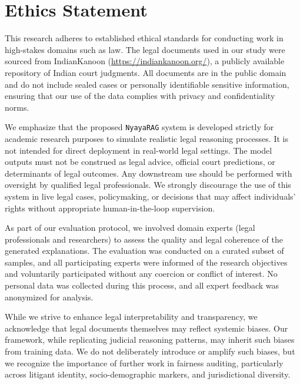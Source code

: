 \section*{Ethics Statement}

This research adheres to established ethical standards for conducting work in high-stakes domains such as law. The legal documents used in our study were sourced from IndianKanoon (\url{https://indiankanoon.org/}), a publicly available repository of Indian court judgments. All documents are in the public domain and do not include sealed cases or personally identifiable sensitive information, ensuring that our use of the data complies with privacy and confidentiality norms.

We emphasize that the proposed \texttt{NyayaRAG} system is developed strictly for academic research purposes to simulate realistic legal reasoning processes. It is not intended for direct deployment in real-world legal settings. The model outputs must not be construed as legal advice, official court predictions, or determinants of legal outcomes. Any downstream use should be performed with oversight by qualified legal professionals. We strongly discourage the use of this system in live legal cases, policymaking, or decisions that may affect individuals' rights without appropriate human-in-the-loop supervision.

As part of our evaluation protocol, we involved domain experts (legal professionals and researchers) to assess the quality and legal coherence of the generated explanations. The evaluation was conducted on a curated subset of samples, and all participating experts were informed of the research objectives and voluntarily participated without any coercion or conflict of interest. No personal data was collected during this process, and all expert feedback was anonymized for analysis.

While we strive to enhance legal interpretability and transparency, we acknowledge that legal documents themselves may reflect systemic biases. Our framework, while replicating judicial reasoning patterns, may inherit such biases from training data. We do not deliberately introduce or amplify such biases, but we recognize the importance of further work in fairness auditing, particularly across litigant identity, socio-demographic markers, and jurisdictional diversity.